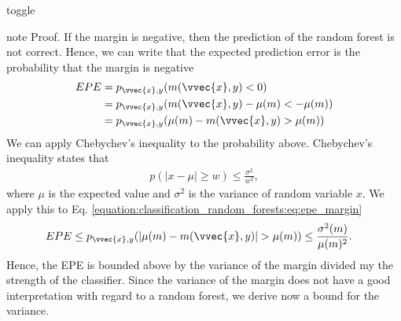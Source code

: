 \documentclass[letterpaper,10pt,english]{jupyterBook}
\begin{document}
\begin{sphinxuseclass}{toggle}
\begin{sphinxadmonition}{note}
\sphinxAtStartPar
Proof. If the margin is negative, then the prediction of the random forest is not correct. Hence, we can write that the expected prediction error is the probability that the margin is negative
\begin{equation}\label{equation:classification_random_forests:eq:epe_margin}
\begin{split}\begin{align*}
EPE &= p_{\vvec{x},y}(m(\vvec{x},y)<0)\\
&= p_{\vvec{x},y}(m(\vvec{x},y)-\mu(m) < -\mu(m))\\
&= p_{\vvec{x},y}(\mu(m) - m(\vvec{x},y) > \mu(m))
\end{align*}\end{split}
\end{equation}
\sphinxAtStartPar
We can apply Chebychev’s inequality to the probability above. Chebychev’s inequality states that
\begin{equation*}
\begin{split}p(\lvert x-\mu\rvert\geq w)\leq \frac{\sigma^2}{w^2},\end{split}
\end{equation*}
where \(\mu\) is the expected value and \(\sigma^2\) is the variance of random variable \(x\).
We apply this to  Eq. \eqref{equation:classification_random_forests:eq:epe_margin}
\begin{align*}
EPE&\leq  p_{\vvec{x},y}(\lvert\mu(m) - m(\vvec{x},y)\rvert > \mu(m))
\leq \frac{\sigma^2(m)}{\mu(m)^2}.
\end{align*}
\sphinxAtStartPar
Hence, the EPE is bounded above by the variance of the margin divided my the strength of the classifier. Since the variance of the margin does not have a good interpretation with regard to a random forest, we derive now a bound for the variance.


\end{sphinxadmonition}
\end{sphinxuseclass}
\end{document}
